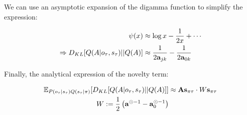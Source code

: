 \documentclass[review,12pt,authoryear]{elsarticle}
\newcommand{\E}{\mathbb E}
\begin{document}
We can use an asymptotic expansion of the digamma function to simplify the expression:

\begin{equation}
    \begin{split}
        \psi(x) &\approx \log x -\frac{1}{2x}+\cdots \\
        \Rightarrow D_{KL}[Q(A|o_\tau, s_\tau) || Q(A)] &\approx \frac{1}{2\bold a_{jk}}-\frac{1}{2\bold a_{0k}}
    \end{split}
\end{equation}

Finally, the analytical expression of the novelty term:

\begin{equation}
\begin{split}
    \E_{P(o_\tau |s_\tau)Q(s_\tau|\pi)}[D_{KL}[Q(A|o_\tau, s_\tau) || Q(A)]] &\approx \bold A \bold s_{\pi \tau}\cdot  W \bold s_{\pi\tau}\\ 
    W :=\frac{1}{2}\left( \bold a^{\odot -1}-\bold a_0^{\odot -1} \right)&
\end{split}
\end{equation}




 






\end{document}
